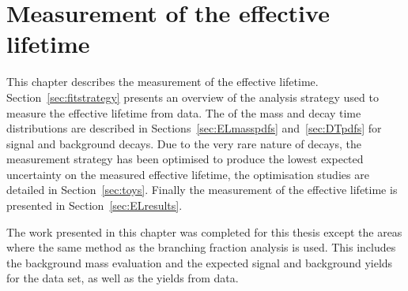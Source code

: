 \chapter{Measurement of the \bsmumu effective lifetime}
\label{sec:lifetimemeasurement}

This chapter describes the measurement of the \bsmumu effective lifetime. %
Section~\ref{sec:fitstrategy} presents an overview of the analysis strategy used to measure the \bsmumu effective lifetime from data. %
The \pdfs of the mass and decay time distributions are described in Sections~\ref{sec:ELmasspdfs} and~\ref{sec:DTpdfs} for signal and background decays. Due to the very rare nature of \bsmumu decays, the measurement strategy has been optimised to produce the lowest expected uncertainty on the measured \bsmumu effective lifetime, the optimisation studies are detailed in Section~\ref{sec:toys}. Finally the measurement of the \bsmumu effective lifetime is presented in Section~\ref{sec:ELresults}.





The work presented in this chapter was completed for this thesis except the areas where the same method as the branching fraction analysis is used. This includes the background mass \pdf evaluation and the expected signal and background yields for the data set, as well as the \bsjpisphi yields from data. 


